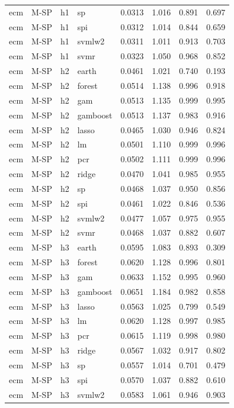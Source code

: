 \begin{ThreePartTable}
\begin{longtable}[t]{llclcccc}
ecm & M-SP & h1 & sp & 0.0313 & 1.016 & 0.891 & 0.697\\
ecm & M-SP & h1 & spi & 0.0312 & 1.014 & 0.844 & 0.659\\
ecm & M-SP & h1 & svmlw2 & 0.0311 & 1.011 & 0.913 & 0.703\\
ecm & M-SP & h1 & svmr & 0.0323 & 1.050 & 0.968 & 0.852\\
\addlinespace
ecm & M-SP & h2 & earth & 0.0461 & 1.021 & 0.740 & 0.193\\
ecm & M-SP & h2 & forest & 0.0514 & 1.138 & 0.996 & 0.918\\
ecm & M-SP & h2 & gam & 0.0513 & 1.135 & 0.999 & 0.995\\
ecm & M-SP & h2 & gamboost & 0.0513 & 1.137 & 0.983 & 0.916\\
ecm & M-SP & h2 & lasso & 0.0465 & 1.030 & 0.946 & 0.824\\
ecm & M-SP & h2 & lm & 0.0501 & 1.110 & 0.999 & 0.996\\
ecm & M-SP & h2 & pcr & 0.0502 & 1.111 & 0.999 & 0.996\\
ecm & M-SP & h2 & ridge & 0.0470 & 1.041 & 0.985 & 0.955\\
ecm & M-SP & h2 & sp & 0.0468 & 1.037 & 0.950 & 0.856\\
ecm & M-SP & h2 & spi & 0.0461 & 1.022 & 0.846 & 0.536\\
ecm & M-SP & h2 & svmlw2 & 0.0477 & 1.057 & 0.975 & 0.955\\
ecm & M-SP & h2 & svmr & 0.0468 & 1.037 & 0.882 & 0.607\\
\addlinespace
ecm & M-SP & h3 & earth & 0.0595 & 1.083 & 0.893 & 0.309\\
ecm & M-SP & h3 & forest & 0.0620 & 1.128 & 0.996 & 0.801\\
ecm & M-SP & h3 & gam & 0.0633 & 1.152 & 0.995 & 0.960\\
ecm & M-SP & h3 & gamboost & 0.0651 & 1.184 & 0.982 & 0.858\\
ecm & M-SP & h3 & lasso & 0.0563 & 1.025 & 0.799 & 0.549\\
ecm & M-SP & h3 & lm & 0.0620 & 1.128 & 0.997 & 0.985\\
ecm & M-SP & h3 & pcr & 0.0615 & 1.119 & 0.998 & 0.980\\
ecm & M-SP & h3 & ridge & 0.0567 & 1.032 & 0.917 & 0.802\\
ecm & M-SP & h3 & sp & 0.0557 & 1.014 & 0.701 & 0.479\\
ecm & M-SP & h3 & spi & 0.0570 & 1.037 & 0.882 & 0.610\\
ecm & M-SP & h3 & svmlw2 & 0.0583 & 1.061 & 0.946 & 0.903\\

\end{longtable}
\end{ThreePartTable}
